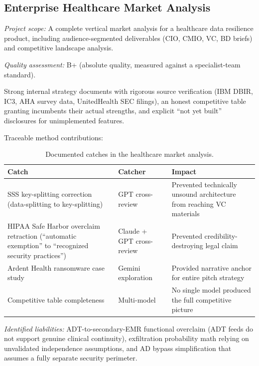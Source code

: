 \documentclass[11pt,letterpaper]{article}
\begin{document}
\subsection{Enterprise Healthcare Market Analysis}

\emph{Project scope:} A complete vertical market analysis for a healthcare data resilience product, including audience-segmented deliverables (CIO, CMIO, VC, BD briefs) and competitive landscape analysis.

\emph{Quality assessment:} B+ (absolute quality, measured against a specialist-team standard).

Strong internal strategy documents with rigorous source verification (IBM DBIR, IC3, AHA survey data, UnitedHealth SEC filings), an honest competitive table granting incumbents their actual strengths, and explicit ``not yet built'' disclosures for unimplemented features.

Traceable method contributions:

\begin{table}[ht]
\centering
\caption{Documented catches in the healthcare market analysis.}
\label{tab:healthcare-catches}
\begin{tabular}{@{}p{4cm}lp{5cm}@{}}
\toprule
\textbf{Catch} & \textbf{Catcher} & \textbf{Impact} \\
\midrule
SSS key-splitting correction (data-splitting to key-splitting) & GPT cross-review & Prevented technically unsound architecture from reaching VC materials \\
\addlinespace
HIPAA Safe Harbor overclaim retraction (``automatic exemption'' to ``recognized security practices'') & Claude + GPT cross-review & Prevented credibility-destroying legal claim \\
\addlinespace
Ardent Health ransomware case study & Gemini exploration & Provided narrative anchor for entire pitch strategy \\
\addlinespace
Competitive table completeness & Multi-model & No single model produced the full competitive picture \\
\bottomrule
\end{tabular}
\end{table}

\emph{Identified liabilities:} ADT-to-secondary-EMR functional overclaim (ADT feeds do not support genuine clinical continuity), exfiltration probability math relying on unvalidated independence assumptions, and AD bypass simplification that assumes a fully separate security perimeter.
\end{document}
